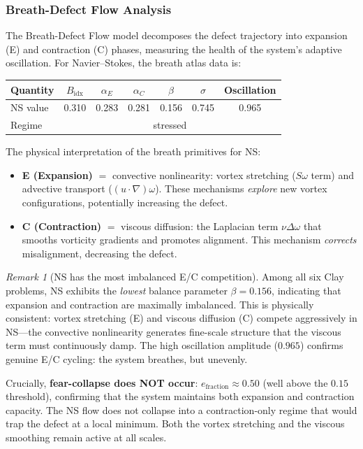 \documentclass[11pt]{article}
\theoremstyle{definition}
\theoremstyle{remark}
\newtheorem{remark}[theorem]{Remark}
\begin{document}
\subsubsection{Breath-Defect Flow Analysis}
\label{sec:breath-analysis}

The Breath-Defect Flow model decomposes the defect trajectory into expansion (E)
and contraction (C) phases, measuring the health of the system's adaptive
oscillation.  For Navier--Stokes, the breath atlas data is:

\begin{center}
\begin{tabular}{lcccccc}
\hline
\textbf{Quantity} & $B_{\mathrm{idx}}$ & $\alpha_E$ & $\alpha_C$ & $\beta$
  & $\sigma$ & Oscillation \\
\hline
NS value & 0.310 & 0.283 & 0.281 & 0.156 & 0.745 & 0.965 \\
Regime & \multicolumn{6}{c}{stressed} \\
\hline
\end{tabular}
\end{center}

\noindent The physical interpretation of the breath primitives for NS:
\begin{itemize}[nosep]
  \item \textbf{E (Expansion)} $= $ convective nonlinearity: vortex stretching
    ($S\omega$ term) and advective transport ($(u \cdot \nabla)\omega$).
    These mechanisms \emph{explore} new vortex configurations, potentially
    increasing the defect.
  \item \textbf{C (Contraction)} $= $ viscous diffusion: the Laplacian term
    $\nu\Delta\omega$ that smooths vorticity gradients and promotes alignment.
    This mechanism \emph{corrects} misalignment, decreasing the defect.
\end{itemize}

\begin{remark}[NS has the most imbalanced E/C competition]
Among all six Clay problems, NS exhibits the \emph{lowest} balance parameter
$\beta = 0.156$, indicating that expansion and contraction are maximally
imbalanced.  This is physically consistent: vortex stretching (E) and viscous
diffusion (C) compete aggressively in NS---the convective nonlinearity
generates fine-scale structure that the viscous term must continuously damp.
The high oscillation amplitude ($0.965$) confirms genuine E/C cycling: the
system breathes, but unevenly.

Crucially, \textbf{fear-collapse does NOT occur}: $e_{\mathrm{fraction}} \approx
0.50$ (well above the $0.15$ threshold), confirming that the system maintains both
expansion and contraction capacity.  The NS flow does not collapse into a
contraction-only regime that would trap the defect at a local minimum.
Both the vortex stretching and the viscous smoothing remain active at all scales.
\end{remark}
\end{document}
